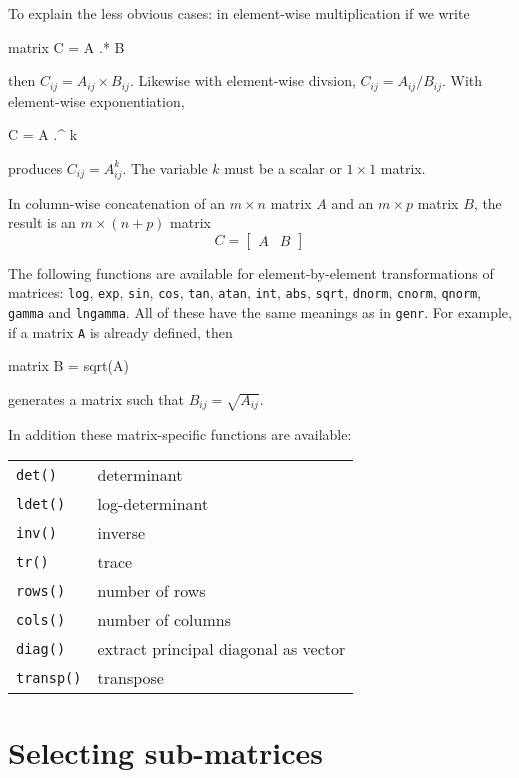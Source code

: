 To explain the less obvious cases: in element-wise multiplication if
we write 
%
\begin{code}
matrix C = A .* B
\end{code}
% 
then $C_{ij} = A_{ij} \times B_{ij}$.  Likewise with element-wise
divsion, $C_{ij} = A_{ij}/B_{ij}$. With element-wise exponentiation,
%
\begin{code}
C = A .^ k
\end{code}
% 
produces $C_{ij} = A_{ij}^k$.  The variable $k$ must be a scalar or
$1\times 1$ matrix.

In column-wise concatenation of an $m\times n$ matrix $A$ and
an $m\times p$ matrix $B$, the result is an $m\times (n+p)$ matrix
%
\[
C = \left[ \begin{array}{cc} A & B \end{array} \right]
\]
%

The following functions are available for element-by-element
transformations of matrices: \texttt{log}, \texttt{exp}, \texttt{sin},
\texttt{cos}, \texttt{tan}, \texttt{atan}, \texttt{int}, \texttt{abs},
\texttt{sqrt}, \texttt{dnorm}, \texttt{cnorm}, \texttt{qnorm},
\texttt{gamma} and \texttt{lngamma}.  All of these have the same
meanings as in \texttt{genr}.  For example, if a matrix \texttt{A} is
already defined, then
%
\begin{code}
matrix B = sqrt(A)
\end{code}
%
generates a matrix such that $B_{ij} = \sqrt{A_{ij}}$.

In addition these matrix-specific functions are available:

\begin{center}
\begin{tabular}{ll}
\texttt{det()} & determinant \\
\texttt{ldet()} & log-determinant \\
\texttt{inv()} & inverse \\
\texttt{tr()} & trace \\
\texttt{rows()} & number of rows \\
\texttt{cols()} & number of columns \\
\texttt{diag()} & extract principal diagonal as vector \\
\texttt{transp()} & transpose 
\end{tabular}
\end{center}

\section{Selecting sub-matrices}
\label{matrix-sub}

